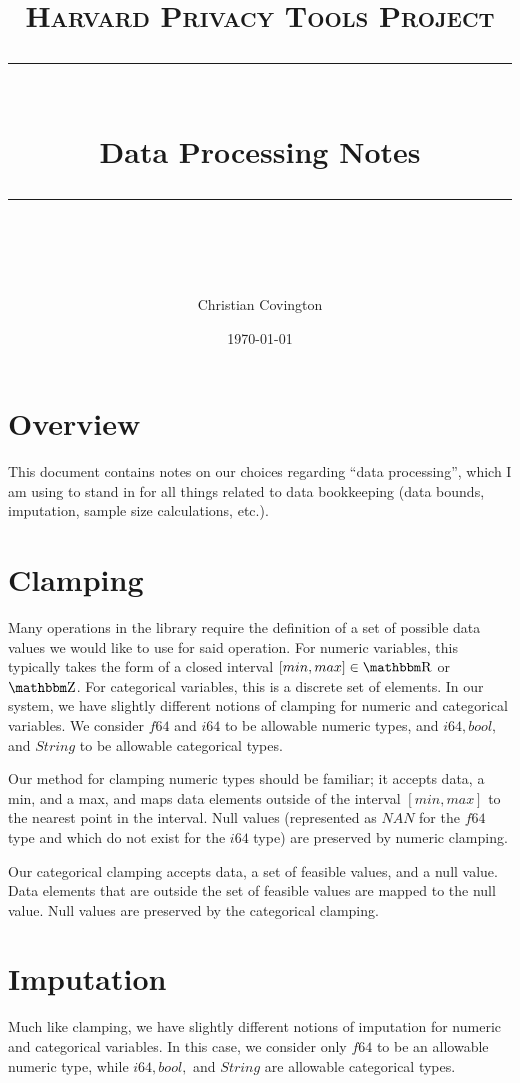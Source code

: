\documentclass[11pt]{scrartcl} %
\title{
	\normalfont\normalsize
	\textsc{Harvard Privacy Tools Project}\\ %
	\vspace{25pt} %
	\rule{\linewidth}{0.5pt}\\ %
	\vspace{20pt} %
	{\huge Data Processing Notes}\\ %
	\vspace{12pt} %
	\rule{\linewidth}{2pt}\\ %
	\vspace{12pt} %
}
\author{\LARGE Christian Covington} %
\date{\normalsize\today} %
\begin{document}
\maketitle

\section{Overview}
This document contains notes on our choices regarding ``data processing'', which I am using to stand in
for all things related to data bookkeeping (data bounds, imputation, sample size calculations, etc.).

\section{Clamping}
Many operations in the library require the definition of a set of possible data values
we would like to use for said operation. For numeric variables, this typically
takes the form of a closed interval $[min, max] \in \R$ or $\Z$. For categorical
variables, this is a discrete set of elements.
In our system, we have slightly different notions of clamping for numeric and categorical variables.
We consider $f64$ and $i64$ to be allowable numeric types, and $i64, bool,$ and $String$ to be
allowable categorical types. \newline

Our method for clamping numeric types should be familiar; it accepts data, a min, and a max,
and maps data elements outside of the interval $[min, max]$ to the nearest point in the interval.
Null values (represented as $NAN$ for the $f64$ type and which do not exist for the $i64$ type)
are preserved by numeric clamping. \newline

Our categorical clamping accepts data, a set of feasible values, and a null value.
Data elements that are outside the set of feasible values are mapped to the null value.
Null values are preserved by the categorical clamping. \newline

\section{Imputation}
Much like clamping, we have slightly different notions of imputation for numeric and categorical variables.
In this case, we consider only $f64$ to be an allowable numeric type, while
$i64, bool,$ and $String$ are allowable categorical types. \newline
\end{document}

